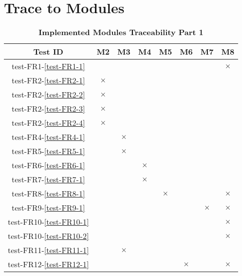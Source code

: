 \documentclass[12pt, titlepage]{article}
\begin{document}
\section{Trace to Modules}
\begin{table}[H]
\centering
\begin{tabular}{|c|c|c|c|c|c|c|c|}
\hline
Test ID & M2 & M3 & M4 & M5 & M6 & M7 & M8 \\
\hline
test-FR1-\ref{test-FR1-1} & & & & & & & $\times$ \\
\hline
test-FR2-\ref{test-FR2-1} & $\times$ & & & & & & \\
\hline
test-FR2-\ref{test-FR2-2} & $\times$ & & & & & & \\
\hline
test-FR2-\ref{test-FR2-3} & $\times$ & & & & & & \\
\hline
test-FR2-\ref{test-FR2-4} & $\times$ & & & & & & \\
\hline
test-FR4-\ref{test-FR4-1} & & $\times$ & & & & & \\
\hline
test-FR5-\ref{test-FR5-1} & & $\times$ & & & & & \\
\hline
test-FR6-\ref{test-FR6-1} & & & $\times$ & & & & \\
\hline
test-FR7-\ref{test-FR7-1} & & & $\times$ & & & & \\
\hline
test-FR8-\ref{test-FR8-1} & & & & $\times$ & & & $\times$ \\
\hline
test-FR9-\ref{test-FR9-1} & & & & & & $\times$ & $\times$ \\
\hline
test-FR10-\ref{test-FR10-1} & & & & & & & $\times$ \\
\hline
test-FR10-\ref{test-FR10-2} & & & & & & & $\times$ \\
\hline
test-FR11-\ref{test-FR11-1} & & $\times$ & & & & & \\
\hline
test-FR12-\ref{test-FR12-1} & & & & & $\times$ & & $\times$ \\
\hline
\end{tabular}
\caption{\bf Implemented Modules Traceability Part 1}
\end{table}
\end{document}

